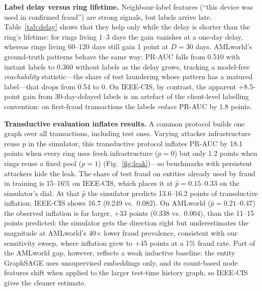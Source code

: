 \documentclass[10pt,letterpaper]{article}
\begin{document}
\begin{table}[!htbp]
\centering
\caption{PR-AUC gain (points, mean $\pm$ 95\% CI over 5 seeds) from delayed neighbour-label features, by label delay $D$ and ring lifetime (simulator, fresh infrastructure per ring). Bold: CI excludes 0.}\label{tab:delay}
\small

\end{table}

\textbf{Label delay versus ring lifetime.} Neighbour-label features (``this device was used in confirmed fraud'') are strong signals, but labels arrive late. Table~\ref{tab:delay} shows that they help only while the delay is shorter than the ring's lifetime: for rings living 1--3 days the gain vanishes at a one-day delay, whereas rings living 60--120 days still gain 1 point at $D=30$ days. AMLworld's ground-truth patterns behave the same way: PR-AUC falls from 0.510 with instant labels to 0.360 without labels as the delay grows, tracking a model-free \emph{reachability} statistic---the share of test laundering whose pattern has a matured label---that drops from 0.54 to 0. On IEEE-CIS, by contrast, the apparent +8.5-point gain from 30-day-delayed labels is an artefact of the client-level labelling convention: on first-fraud transactions the labels \emph{reduce} PR-AUC by 1.8 points.

\textbf{Transductive evaluation inflates results.} A common protocol builds one graph over all transactions, including test ones. Varying attacker infrastructure reuse $p$ in the simulator, this transductive protocol inflates PR-AUC by 18.1 points when every ring uses fresh infrastructure ($p=0$) but only 1.2 points when rings reuse a fixed pool ($p=1$) (Fig.~\ref{fig:leak})---so benchmarks with persistent attackers hide the leak. The share of test fraud on entities already used by fraud in training is 15--16\% on IEEE-CIS, which places it at $\hat p=0.15$--$0.33$ on the simulator's dial. At that $\hat p$ the simulator predicts 13.6--16.2 points of transductive inflation; IEEE-CIS shows 16.7 (0.249 vs.\ 0.082). On AMLworld ($\hat p=0.21$--$0.47$) the observed inflation is far larger, +33 points (0.338 vs.\ 0.004), than the 11--15 points predicted: the simulator gets the direction right but underestimates the magnitude at AMLworld's 40$\times$ lower fraud prevalence, consistent with our sensitivity sweep, where inflation grew to +45 points at a 1\% fraud rate. Part of the AMLworld gap, however, reflects a weak inductive baseline: the entity GraphSAGE uses unsupervised embeddings only, and its count-based node features shift when applied to the larger test-time history graph, so IEEE-CIS gives the cleaner estimate.
\end{document}
